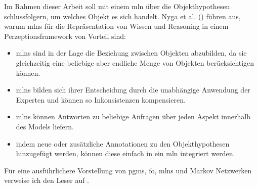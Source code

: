 Im Rahmen dieser Arbeit soll \robosherlock mit einem \gls{mln} über die Objekthypothesen schlussfolgern, um welches Objekt es sich handelt. Nyga et al. (\cite{pr2looking}) führen aus, warum \glspl{mln} für die Repräsentation von Wissen und Reasoning in einem Perzeptionsframework von Vorteil sind: 
\begin{itemize}
	\item \glspl{mln} sind in der Lage die Beziehung zwischen Objekten abzubilden, da sie gleichzeitig eine beliebige aber endliche Menge von Objekten berücksichtigen können.
	\item \glspl{mln} bilden sich ihrer Entscheidung durch die unabhängige Anwendung der Experten und können so Inkonsistenzen kompensieren.
	\item \glspl{mln} können Antworten zu beliebige Anfragen über jeden Aspekt innerhalb des Models liefern. 
	\item indem neue oder zusätzliche Annotationen zu den Objekthypothesen hinzugefügt werden, können diese einfach in ein \gls{mln} integriert werden.    
\end{itemize}   
Für eine ausführlichere Vorstellung von \glspl{pgm}, \gls{fo}, \glspl{mln} und Markov Netzwerken verweise ich den Leser auf \cite{nyga17, mln, jain}. \par 

